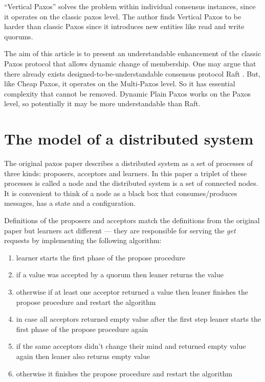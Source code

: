 \documentclass[12pt]{article}
\begin{document}
\smallskip

``Vertical Paxos'' solves the problem within individual consensus instances, since it operates on the classic paxos level. The author finds Vertical Paxos to be harder than classic Paxos since it introduces new entities like read and write quorums.

\medskip

The aim of this article is to present an understandable enhancement of the classic Paxos protocol that allows dynamic change of membership. One may argue that there already exists designed-to-be-understandable consensus protocol Raft \cite{raft}. But, like Cheap Paxos, it operates on the Multi-Paxos level. So it has essential complexity that cannot be removed. Dynamic Plain Paxos works on the Paxos level, so potentially it may be more understandable than Raft.

\section{The model of a distributed system}

The original paxos paper describes a distributed system as a set of processes of three kinds: proposers, acceptors and learners. In this paper a triplet of these processes is called a node and the distributed system is a set of connected nodes. It is convenient to think of a node as a black box that consumes/produces messages, has a state and a configuration.

Definitions of the proposers and acceptors match the definitions from the original paper but learners act different --- they are responsible for serving the {\it get} requests by implementing the following algorithm:

\begin{enumerate}
\item learner starts the first phase of the propose procedure
\item if a value was accepted by a quorum then leaner returns the value 
\item otherwise if at least one acceptor returned a value then leaner finishes the propose procedure and restart the algorithm
\item in case all acceptors returned empty value after the first step leaner starts the first phase of the propose procedure again
\item if the same acceptors didn't change their mind and returned empty value again then leaner also returns empty value
\item otherwise it finishes the propose procedure and restart the algorithm
\end{enumerate}
\end{document}
